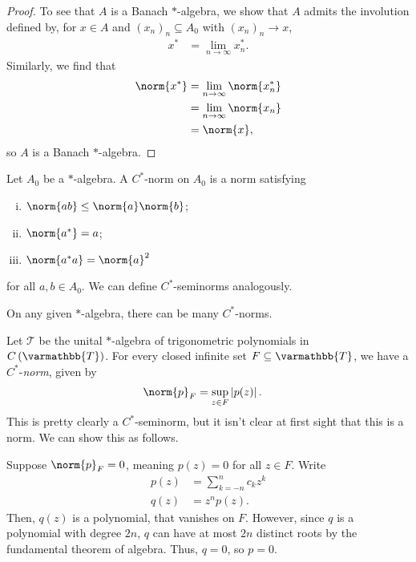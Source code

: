 \documentclass[10pt]{mypackage}
\renewcommand*{\mathbb}[1]{\varmathbb{#1}}
\newcommand{\T}{\mathbb{T}}
\begin{document}
\begin{proof}
  To see that $A$ is a Banach $\ast$-algebra, we show that $A$ admits the involution defined by, for $x\in A$ and $\left(x_n\right)_n\subseteq A_0$ with $\left(x_n\right)_n\rightarrow x$,
  \begin{align*}
    x^{\ast} &= \lim_{n\rightarrow\infty}x_n^{\ast}.
  \end{align*}
  Similarly, we find that
  \begin{align*}
    \norm{x^{\ast}} &= \lim_{n\rightarrow\infty}\norm{x_n^{\ast}}\\
                    &= \lim_{n\rightarrow\infty}\norm{x_n}\\
                    &= \norm{x},
  \end{align*}
  so $A$ is a Banach $\ast$-algebra.
\end{proof}
\begin{definition}
  Let $A_0$ be a $\ast$-algebra. A $C^{\ast}$-norm on $A_0$ is a norm satisfying
  \begin{enumerate}[(i)]
    \item $\norm{ab}\leq \norm{a}\norm{b}$;
    \item $\norm{a^{\ast}} = a$;
    \item $\norm{a^{\ast}a} = \norm{a}^2$
  \end{enumerate}
  for all $a,b\in A_0$. We can define $C^{\ast}$-seminorms analogously.
\end{definition}
On any given $\ast$-algebra, there can be many $C^{\ast}$-norms.
\begin{example}
  Let $\mathcal{T}$ be the unital $\ast$-algebra of trigonometric polynomials in $C\left(\T\right)$. For every closed infinite set $F\subseteq \T$, we have a $C^{\ast}$-\textit{norm}, given by
  \begin{align*}
    \norm{p}_{F} &= \sup_{z\in F}\left\vert p(z) \right\vert.
  \end{align*}
  This is pretty clearly a $C^{\ast}$-seminorm, but it isn't clear at first sight that this is a norm. We can show this as follows.\newline

  Suppose $\norm{p}_{F} = 0$, meaning $p(z) = 0$ for all $z\in F$. Write
  \begin{align*}
    p(z) &= \sum_{k=-n}^{n}c_kz^{k}\\
    q(z) &= z^n p(z).
  \end{align*}
  Then, $q(z)$ is a polynomial, that vanishes on $F$. However, since $q$ is a polynomial with degree $2n$, $q$ can have at most $2n$ distinct roots by the fundamental theorem of algebra. Thus, $q = 0$, so $p = 0$.
\end{example}
\end{document}
